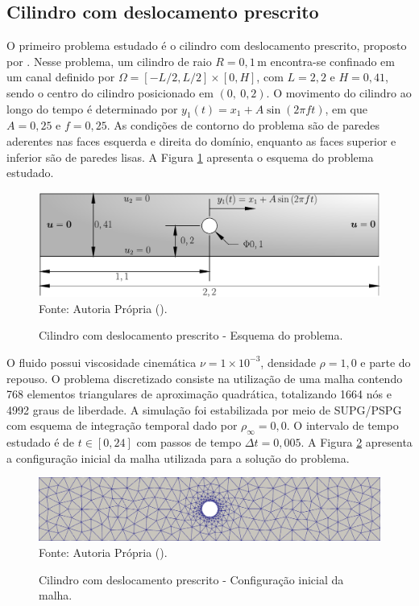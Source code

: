 \subsection{Cilindro com deslocamento prescrito}

O primeiro problema estudado é o cilindro com deslocamento prescrito, proposto por . Nesse problema, um cilindro de raio $R=0,1\,\mathrm{m}$ encontra-se confinado em um canal definido por $\Omega=[-L/2, L/2]\times[0,H]$, com $L=2,2$ e $H=0,41$, sendo o centro do cilindro posicionado em $(0,\ 0,2)$. O movimento do cilindro ao longo do tempo é determinado por $y_1(t)=x_1+A\sin{(2\pi f t)}$, em que $A=0,25$ e $f=0,25$. As condições de contorno do problema são de paredes aderentes nas faces esquerda e direita do domínio, enquanto as faces superior e inferior são de paredes lisas. A Figura \ref{fig:moving-cylinder} apresenta o esquema do problema estudado.

\begin{figure}[h!]
    \centering
    \caption{Cilindro com deslocamento prescrito - Esquema do problema.}
    \includegraphics[width=.7\linewidth]{Figuras/moving-cylinder/moving-cilinder.pdf}
    \\Fonte: Autoria Própria (\the\year).
    \label{fig:moving-cylinder}
\end{figure}

O fluido possui viscosidade cinemática $\nu=1\times10^{-3}$, densidade $\rho=1,0$ e parte do repouso. O problema discretizado consiste na utilização de uma malha contendo 768 elementos triangulares de aproximação quadrática, totalizando 1664 nós e 4992 graus de liberdade. A simulação foi estabilizada por meio de SUPG/PSPG com esquema de integração temporal dado por $\rho_\infty=0,0$. O intervalo de tempo estudado é de $t\in[0,24]$ com passos de tempo $\Delta t=0,005$. A Figura \ref{fig:moving-cylinder-mesh} apresenta a configuração inicial da malha utilizada para a solução do problema.

\begin{figure}[h!]
    \centering
    \caption{Cilindro com deslocamento prescrito - Configuração inicial da malha.}
    \includegraphics[width=\linewidth]{Figuras/moving-cylinder/mesh1.png}
    \\Fonte: Autoria Própria (\the\year).
    \label{fig:moving-cylinder-mesh}
\end{figure}

